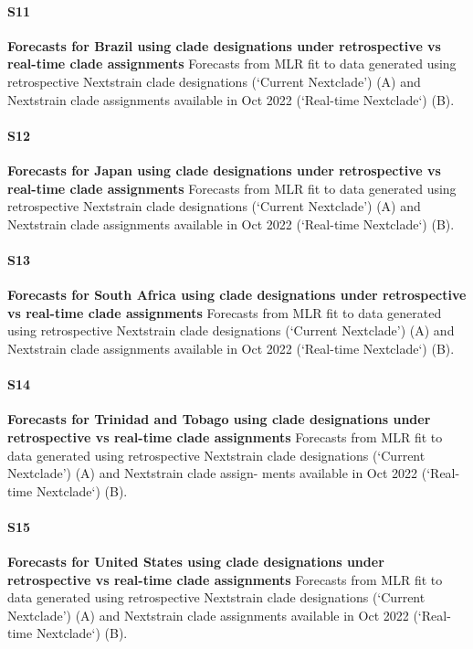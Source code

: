 \documentclass[10pt,letterpaper]{article}
\begin{document}
\paragraph*{S11}
\label{fig:S11}
{\bf Forecasts for Brazil using clade designations under retrospective vs real-time clade assignments}
Forecasts from MLR fit to data generated using retrospective Nextstrain
clade designations (‘Current Nextclade’) (A) and Nextstrain clade assignments available in Oct
2022 (‘Real-time Nextclade‘) (B).

\paragraph*{S12}
\label{fig:S12}
{\bf Forecasts for Japan using clade designations under retrospective vs real-time clade assignments}
Forecasts from MLR fit to data generated using retrospective Nextstrain
clade designations (‘Current Nextclade’) (A) and Nextstrain clade assignments available in Oct
2022 (‘Real-time Nextclade‘) (B).

\paragraph*{S13}
\label{fig:S13}
{\bf Forecasts for South Africa using clade designations under retrospective vs real-time clade assignments }
Forecasts from MLR fit to data generated using retrospective Nextstrain clade designations (‘Current Nextclade’) (A) and Nextstrain clade assignments available
in Oct 2022 (‘Real-time Nextclade‘) (B).

\paragraph*{S14}
\label{fig:S14}
{\bf Forecasts for Trinidad and Tobago using clade designations under retrospective vs real-time clade assignments}
Forecasts from MLR fit to data generated using retrospective Nextstrain clade designations (‘Current Nextclade’) (A) and Nextstrain clade assign-
ments available in Oct 2022 (‘Real-time Nextclade‘) (B).

\paragraph*{S15}
\label{fig:S15}
{\bf Forecasts for United States using clade designations under retrospective vs real-time clade assignments}
Forecasts from MLR fit to data generated using retrospective Nextstrain clade designations (‘Current Nextclade’) (A) and Nextstrain clade assignments available
in Oct 2022 (‘Real-time Nextclade‘) (B).
\end{document}

